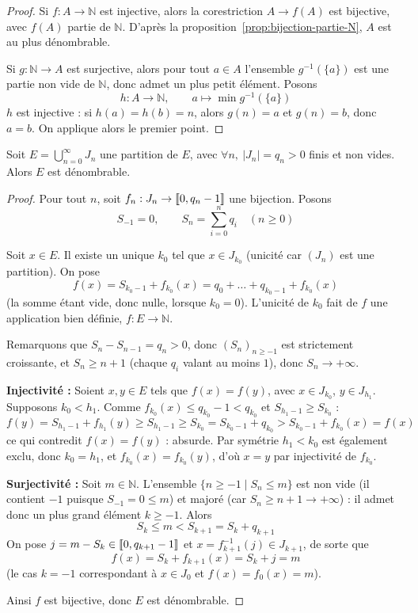\begin{proof}
Si $f:A\to\mathbb{N}$ est injective, alors la corestriction $A \to f(A)$ est bijective, avec $f(A)$ partie de $\mathbb{N}$. D'après la proposition~\ref{prop:bijection-partie-N}, $A$ est au plus dénombrable.

Si $g:\mathbb{N}\to A$ est surjective, alors pour tout $a\in A$ l'ensemble $g^{-1}(\{a\})$ est une partie non vide de $\mathbb{N}$, donc admet un plus petit élément. Posons
\[h : A\to\mathbb{N}, \qquad a\mapsto \min g^{-1}(\{a\})\]
$h$ est injective : si $h(a)=h(b)=n$, alors $g(n)=a$ et $g(n)=b$, donc $a=b$. On applique alors le premier point.
\end{proof}

\begin{prop}
\label{prop:partition-finies}
Soit $E = \displaystyle\bigcup_{n=0}^{\infty} J_n$ une partition de $E$, avec $\forall n,\ |J_n|=q_n>0$ finis et non vides. Alors $E$ est dénombrable.
\end{prop}

\begin{proof}
Pour tout $n$, soit $f_n : J_n \to \llbracket 0,q_n-1 \rrbracket$ une bijection. Posons
\[S_{-1}=0, \qquad S_n = \sum_{i=0}^{n} q_i \quad (n\geq 0)\]

Soit $x\in E$. Il existe un unique $k_0$ tel que $x\in J_{k_0}$ (unicité car $(J_n)$ est une partition). On pose
\[f(x) = S_{k_0-1} + f_{k_0}(x) = q_0 + \dots + q_{k_0-1} + f_{k_0}(x)\]
(la somme étant vide, donc nulle, lorsque $k_0=0$). L'unicité de $k_0$ fait de $f$ une application bien définie, $f:E\to\mathbb{N}$.

Remarquons que $S_n - S_{n-1} = q_n>0$, donc $(S_n)_{n\geq -1}$ est strictement croissante, et $S_n\geq n+1$ (chaque $q_i$ valant au moins $1$), donc $S_n\to+\infty$.

\textbf{Injectivité :} Soient $x,y\in E$ tels que $f(x)=f(y)$, avec $x\in J_{k_0}$, $y\in J_{h_1}$. Supposons $k_0<h_1$. Comme $f_{k_0}(x)\leq q_{k_0}-1<q_{k_0}$ et $S_{h_1-1}\geq S_{k_0}$ :
\[f(y) = S_{h_1-1}+f_{h_1}(y) \geq S_{h_1-1} \geq S_{k_0} = S_{k_0-1}+q_{k_0} > S_{k_0-1}+f_{k_0}(x) = f(x)\]
ce qui contredit $f(x)=f(y)$ : absurde. Par symétrie $h_1<k_0$ est également exclu, donc $k_0=h_1$, et $f_{k_0}(x)=f_{k_0}(y)$, d'où $x=y$ par injectivité de $f_{k_0}$.

\textbf{Surjectivité :} Soit $m\in\mathbb{N}$. L'ensemble $\{n\geq -1 \mid S_n\leq m\}$ est non vide (il contient $-1$ puisque $S_{-1}=0\leq m$) et majoré (car $S_n\geq n+1\to+\infty$) : il admet donc un plus grand élément $k\geq -1$. Alors
\[S_k \leq m < S_{k+1} = S_k + q_{k+1}\]
On pose $j = m-S_k \in \llbracket 0,q_{k+1}-1 \rrbracket$ et $x = f_{k+1}^{-1}(j) \in J_{k+1}$, de sorte que
\[f(x) = S_k + f_{k+1}(x) = S_k+j = m\]
(le cas $k=-1$ correspondant à $x\in J_0$ et $f(x)=f_0(x)=m$).

Ainsi $f$ est bijective, donc $E$ est dénombrable.
\end{proof}

